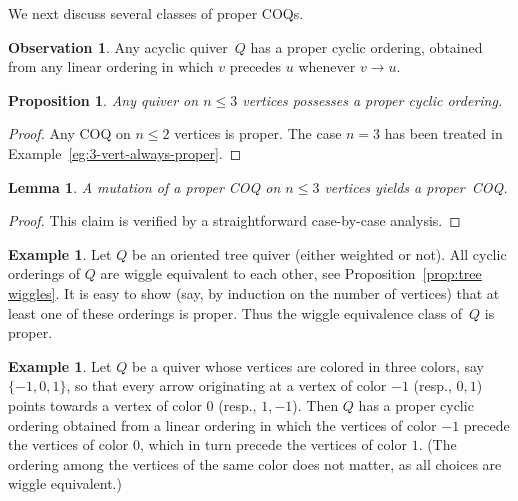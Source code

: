 \documentclass[11pt, letterpaper]{amsart}
\newtheorem{proposition}[theorem]{Proposition}
\newtheorem{lemma}[theorem]{Lemma}
\theoremstyle{definition}
\newtheorem{example}[theorem]{Example}
\newtheorem{observation}[theorem]{Observation}
\numberwithin{equation}{section}
\begin{document}
We next discuss several classes of proper COQs. 

\begin{observation}
\label{ob:acyclic-proper}
Any acyclic quiver~$Q$ has a proper cyclic ordering, obtained from any linear ordering in which $v$ precedes $u$ whenever $v \rightarrow u$. 
\end{observation}

\pagebreak[3]

\begin{proposition}
\label{pr:3vertex proper}
 Any quiver on $n\le 3$ vertices possesses a proper cyclic ordering. 
\end{proposition}

\begin{proof}
Any COQ on $n\le2$ vertices is proper.
The case $n=3$ has been treated in Example~\ref{eg:3-vert-always-proper}. 
\end{proof}

\begin{lemma}
\label{lem:n=3-tot-proper}
A mutation of a proper COQ on $n\le 3$ vertices yields a proper~COQ. 
\end{lemma}

\begin{proof}
This claim is verified by a straightforward case-by-case analysis. 
\end{proof}

\begin{example}
\label{eg:trees-are-proper}
Let $Q$ be an oriented tree quiver (either weighted or not). 
All cyclic orderings of $Q$ are wiggle equivalent to each other, see Proposition~\ref{prop:tree wiggles}. 
It is easy to show (say, by induction on the number of vertices) that at least one of these orderings is proper. 
Thus the wiggle equivalence class of~$Q$ is proper. 
\end{example}


\begin{example} 
\label{eg:3-colors}
Let $Q$ be a quiver whose vertices are colored in three colors, say ${\{-1, 0,1\}}$, so that every arrow originating at a vertex of color $-1$ (resp., $0, 1$) points towards a vertex of color $0$ (resp., $1, -1$). 
Then $Q$ has a proper cyclic ordering obtained from a linear ordering in which the vertices of color $-1$ precede the vertices of color $0$, which in turn precede the vertices of color $1$. 
(The ordering among the vertices of the same color does not matter, as all choices are wiggle equivalent.) 
\end{example}
\end{document}
